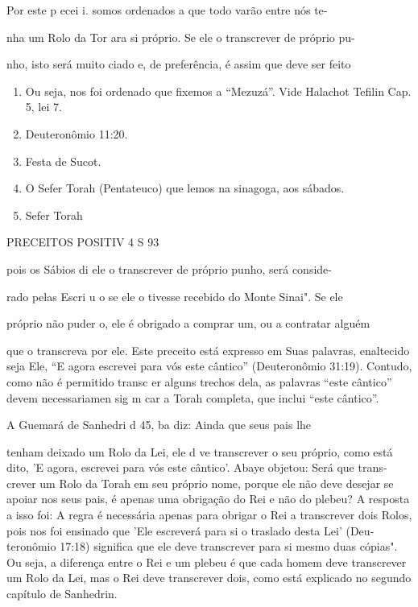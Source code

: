 Por este p ecei i. somos ordenados a que todo varão entre nós te-


nha um Rolo da Tor ara si próprio. Se ele o transcrever de próprio pu-

nho, isto será muito ciado e, de preferência, é assim que deve ser feito


\begin{enumerate}
\def\labelenumi{\arabic{enumi}.}
\setcounter{enumi}{38}
\item
 
 Ou seja, nos foi ordenado que fixemos a ``Mezuzá''. Vide Halachot
 Tefilin Cap. 5, lei 7.
 
\item
 
 Deuteronômio 11:20.
 
\item
 
 Festa de Sucot.
 
\item
 
 O Sefer Torah (Pentateuco) que lemos na sinagoga, aos sábados.
 
\item
 
 Sefer Torah
 
\end{enumerate}


PRECEITOS POSITIV 4 S 93

pois os Sábios di ele o transcrever de próprio punho, será conside-

rado pelas Escri u o se ele o tivesse recebido do Monte Sinai". Se ele

próprio não puder o, ele é obrigado a comprar um, ou a contratar alguém

que o transcreva por ele. Este preceito está expresso em Suas palavras,
enalte­cido seja Ele, ``E agora escrevei para vós este cântico''
(Deuteronômio 31:19). Contudo, como não é permitido transc er alguns
trechos dela, as palavras ``este cântico'' devem necessariamen sig m car a
Torah completa, que inclui ``este cântico''.

A Guemará de Sanhedri d 45, ba diz: Ainda que seus pais lhe

tenham deixado um Rolo da Lei, ele d ve transcrever o seu próprio, como
está dito, 'E agora, escrevei para vós este cântico'. Abaye objetou:
Será que trans­crever um Rolo da Torah em seu próprio nome, porque ele
não deve desejar se apoiar nos seus pais, é apenas uma obrigação do Rei
e não do plebeu? A res­posta a isso foi: A regra é necessária apenas
para obrigar o Rei a transcrever dois Rolos, pois nos foi ensinado que
'Ele escreverá para si o traslado desta Lei' (Deu­teronômio 17:18)
significa que ele deve transcrever para si mesmo duas cópias". Ou seja,
a diferença entre o Rei e um plebeu é que cada homem deve transcre­ver
um Rolo da Lei, mas o Rei deve transcrever dois, como está explicado no
segundo capítulo de Sanhedrin.

